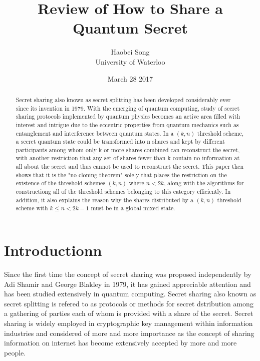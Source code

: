 \documentclass[12pt]{article}
\title{\textbf{Review of How to Share a Quantum Secret \cite{review}}} \author{Haobei Song\\University of Waterloo}
\date{March 28 2017}
\begin{document}
 

\maketitle
\newpage


\begin{abstract}
	Secret sharing also known as secret splitting has been developed considerably ever since its invention in 1979. With the emerging of quantum computing, study of secret sharing protocols implemented by quantum physics becomes an active area filled with interest and intrigue due to the eccentric properties from quantum mechanics such as entanglement and interference between quantum states.
	In a $(k,n)$ threshold scheme, a secret quantum state could be transformed into n shares and kept by different participants among whom only k or more shares combined can reconstruct the secret, with another restriction that any set of shares fewer than k contain no information at all about the secret and thus cannot be used to reconstruct the secret.
	This paper then shows that it is the "no-cloning theorem" solely that places the restriction on the existence of the threshold schemes $(k, n)$ where $n < 2k$, along with the algorithms for constructiong all of the threshold schemes belonging to this category efficiently. In addition, it also explains the reason why the shares distributed by a $(k,n)$ threshold scheme with $k \leq n < 2k-1$ must be in a global mixed state.
	
\end{abstract}

\section{Introductionn}
Since the first time the concept of secret sharing was proposed independently by Adi Shamir\cite{Shamir} and George Blakley\cite{Blakley} in 1979, it has gained appreciable attention and has been studied extensively in quantum computing.
	Secret sharing also known as secret splitting is refered to as protocols or methods for secret dstribution among a gathering of parties each of whom is provided with a share of the secret. 
	Secret sharing is widely employed in cryptographic key management within information industries and considered of more and more importance as the concept of sharing information on internet has become extensively accepted by more and more people.
\end{document}
